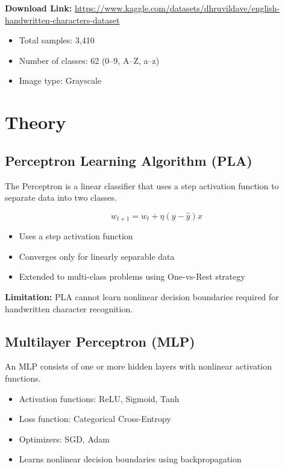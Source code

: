 \documentclass[11pt]{article}
\begin{document}
\textbf{Download Link:}  
\href{https://www.kaggle.com/datasets/dhruvildave/english-handwritten-characters-dataset}{https://www.kaggle.com/datasets/dhruvildave/english-handwritten-characters-dataset}

\begin{itemize}
    \item Total samples: 3,410
    \item Number of classes: 62 (0--9, A--Z, a--z)
    \item Image type: Grayscale
\end{itemize}

\section*{Theory}

\subsection*{Perceptron Learning Algorithm (PLA)}
The Perceptron is a linear classifier that uses a step activation function to separate data into two classes.

\[
w_{t+1} = w_t + \eta (y - \hat{y})x
\]

\begin{itemize}
    \item Uses a step activation function
    \item Converges only for linearly separable data
    \item Extended to multi-class problems using One-vs-Rest strategy
\end{itemize}

\textbf{Limitation:} PLA cannot learn nonlinear decision boundaries required for handwritten character recognition.

\subsection*{Multilayer Perceptron (MLP)}
An MLP consists of one or more hidden layers with nonlinear activation functions.

\begin{itemize}
    \item Activation functions: ReLU, Sigmoid, Tanh
    \item Loss function: Categorical Cross-Entropy
    \item Optimizers: SGD, Adam
    \item Learns nonlinear decision boundaries using backpropagation
\end{itemize}
\end{document}
